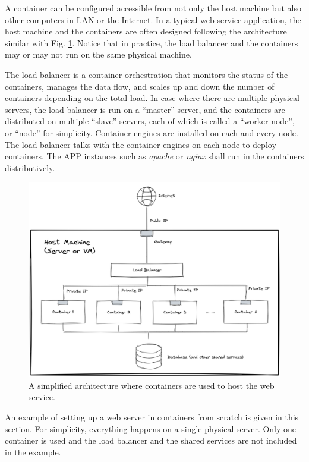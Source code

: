 A container can be configured accessible from not only the host machine but also other computers in LAN or the Internet. In a typical web service application, the host machine and the containers are often designed following the architecture similar with Fig. \ref{ch:vac:fig:containerwebserverarchitecture}. Notice that in practice, the load balancer and the containers may or may not run on the same physical machine.

The load balancer is a container orchestration that monitors the status of the containers, manages the data flow, and scales up and down the number of containers depending on the total load. In case where there are multiple physical servers, the load balancer is run on a ``master'' server, and the containers are distributed on multiple ``slave'' servers, each of which is called a ``worker node'', or ``node'' for simplicity. Container engines are installed on each and every node. The load balancer talks with the container engines on each node to deploy containers. The APP instances such as \textit{apache} or \textit{nginx} shall run in the containers distributively.
\begin{figure}[htbp]
	\centering
	\includegraphics[width=350pt]{chapters/ch-virtualization-and-containerization/figures/containerwebserverarchitecture.png}
	\caption{A simplified architecture where containers are used to host the web service.} \label{ch:vac:fig:containerwebserverarchitecture}
\end{figure}

An example of setting up a web server in containers from scratch is given in this section. For simplicity, everything happens on a single physical server. Only one container is used and the load balancer and the shared services are not included in the example.

